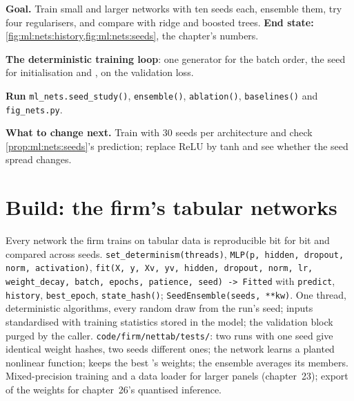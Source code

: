 \begin{tutorial}
\textbf{Goal.} Train small and larger networks with ten seeds each, ensemble them, try four regularisers, and compare
with ridge and boosted trees. \textbf{End state:} \cref{fig:ml:nets:history,fig:ml:nets:seeds}, the chapter's numbers.
\begin{tutsteps}
\item \textbf{The deterministic training loop}: one generator for the batch order, the seed for initialisation and
,  on the validation loss.
\label{lst:ml:nets:fit}
\item \textbf{Run} \texttt{ml\_nets.seed\_study()}, \texttt{ensemble()}, \texttt{ablation()}, \texttt{baselines()} and
\texttt{fig\_nets.py}.
\end{tutsteps}
\textbf{What to change next.} Train with 30 seeds per architecture and check \cref{prop:ml:nets:seeds}'s prediction;
replace ReLU by tanh and see whether the seed spread changes.
\end{tutorial}

\section{Build: the firm's tabular networks}\label{bld:ml:neural-networks-for-noisy-tabular-data:nettab}

\begin{build}
 Every network the firm trains on tabular data is reproducible bit for bit and compared across seeds.
 \texttt{set\_determinism(threads)}, \texttt{MLP(p, hidden, dropout, norm, activation)},
\texttt{fit(X, y, Xv, yv, hidden, dropout, norm, lr, weight\_decay, batch, epochs, patience, seed) -> Fitted} with
\texttt{predict}, \texttt{history}, \texttt{best\_epoch}, \texttt{state\_hash()}; \texttt{SeedEnsemble(seeds, **kw)}.
 One thread, deterministic algorithms, every random draw from the run's seed; inputs standardised with
training statistics stored in the model; the validation block purged by the caller.
 \texttt{code/firm/nettab/tests/}: two runs with one seed give identical weight hashes, two seeds
different ones; the network learns a planted nonlinear function;  keeps the best 's weights; the
ensemble averages its members.
 Mixed-precision training and a data loader for larger panels (chapter~23); export of the weights for
chapter~26's quantised inference.
\end{build}

